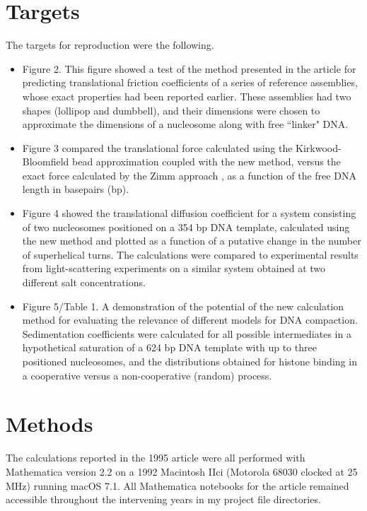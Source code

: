 \section{Targets}

The targets for reproduction were the following.

\begin{itemize}

\item Figure 2. This figure showed a test of the method presented in the article for predicting translational friction coefficients of a series of  reference assemblies, whose exact properties had been reported earlier. These assemblies had two shapes (lollipop and dumbbell), and their dimensions were chosen to approximate the dimensions of a nucleosome along with free ``linker" DNA.

\item Figure 3 compared the translational force calculated using the Kirkwood-Bloomfield bead approximation coupled with the new method, versus the exact force calculated by the Zimm approach \supercite{Zimm1980}, as a function of the free DNA length in basepairs (bp).

\item Figure 4 showed the translational diffusion coefficient for a system consisting of two nucleosomes positioned on a 354 bp DNA template, calculated using the new method and plotted as a function of a putative change in the number of superhelical turns. The calculations were compared to experimental results from light-scattering experiments on a similar system obtained at two different salt concentrations.

\item Figure 5/Table 1. A demonstration of the potential of the new calculation method for evaluating the relevance of different models for DNA compaction. Sedimentation coefficients were calculated for all possible intermediates in a hypothetical saturation of a 624 bp DNA template with up to three positioned nucleosomes, and the distributions obtained for histone binding in a cooperative versus a non-cooperative (random) process.

\end{itemize}

\section{Methods}

The calculations reported in the 1995 article were all performed with Mathematica version 2.2 on a 1992 Macintosh IIci (Motorola 68030 clocked at 25 MHz) running macOS 7.1. All Mathematica notebooks for the article remained accessible throughout the intervening years in my project file directories.

